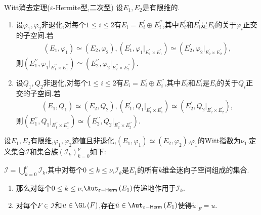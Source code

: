 \begin{corollary}{Witt消去定理($\varepsilon$-Hermite型,二次型)}{}
	设$E_{1},E_{2}$是有限维的.
	\begin{enumerate}
		\item 设$\varphi_{1},\varphi_{2}$非退化,对每个$1\leq i\leq 2$有$E_{i}=E_{i}^{\prime}\oplus E_{i}^{\prime\prime}$,其中$E_{i}^{\prime}$和$E_{i}^{\prime}$是$E_{i}$的关于$\varphi_{i}$正交的子空间.若
		\begin{align*}
			\left(E_{1},\varphi_{1}\right)\simeq\left(E_{2},\varphi_{2}\right),
			\left(E_{1}^{\prime},\varphi_{1}|_{E_{1}^{\prime}\times E_{1}^{\prime}}\right)\simeq\left(E_{2}^{\prime},\varphi_{2}|_{E_{2}^{\prime}\times E_{2}^{\prime}}\right),
		\end{align*}
		则$\left(E_{1}^{\prime\prime},\varphi_{1}|_{E_{1}^{\prime\prime}\times E_{1}^{\prime\prime}}\right)\simeq\left(E_{2}^{\prime\prime},\varphi_{2}|_{E_{2}^{\prime\prime}\times E_{2}^{\prime\prime}}\right)$.
		\item 设$Q_{1},Q_{2}$非退化,对每个$1\leq i\leq 2$有$E_{i}=E_{i}^{\prime}\oplus E_{i}^{\prime\prime}$,其中$E_{i}^{\prime}$和$E_{i}^{\prime}$是$E_{i}$的关于$Q_{i}$正交的子空间.若
		\begin{align*}
			\left(E_{1},Q_{1}\right)\simeq\left(E_{2},Q_{2}\right),
			\left(E_{1}^{\prime},Q_{1}|_{E_{1}^{\prime}\times E_{1}^{\prime}}\right)\simeq\left(E_{2}^{\prime},Q_{2}|_{E_{2}^{\prime}\times E_{2}^{\prime}}\right),
		\end{align*}
		则$\left(E_{1}^{\prime\prime},Q_{1}|_{E_{1}^{\prime\prime}\times E_{1}^{\prime\prime}}\right)\simeq\left(E_{2}^{\prime\prime},Q_{2}|_{E_{2}^{\prime\prime}\times E_{2}^{\prime\prime}}\right)$.
	\end{enumerate}
\end{corollary}

\begin{corollary}{}{}
	设$E_{1},E_{2}$有限维,$\varphi_{1},\varphi_{2}$迹值且非退化,$\left(E_{1},\varphi_{1}\right)\simeq\left(E_{2},\varphi_{2}\right)$,$\varphi_{1}$的Witt指数为$\nu_{1}$.定义集合$\mathcal{I}$和集合族$\left(\mathcal{I}_{k}\right)_{k=0}^{\nu}$如下:
	\begin{center}
		$\mathcal{I}=\bigcup\limits_{k=0}^{\nu}\mathcal{I}_{k}$,其中对每个$0\leq k\leq\nu$,$\mathcal{I}_{k}$是$E_{1}$的所有$k$维全迷向子空间组成的集合.
	\end{center}
	\begin{enumerate}
		\item 那么对每个$0\leq k\leq\nu$,$\Aut_{\varepsilon-\mathsf{Herm}}\left(E_{1}\right)$传递地作用于$\mathcal{I}_{k}$.
		\item 对每个$F\in\mathcal{I}$和$u\in\GL\left(F\right)$,存在$\tilde{u}\in\Aut_{\varepsilon-\mathsf{Herm}}\left(E_{1}\right)$使得$\tilde{u}|_{F}=u$.
	\end{enumerate}
\end{corollary}

